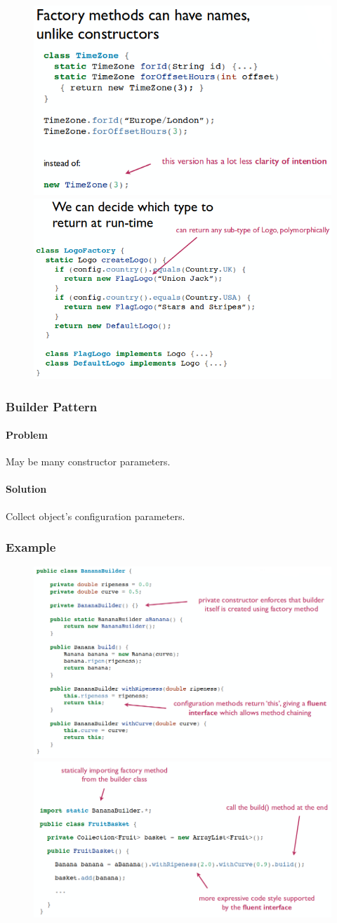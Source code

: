 \documentclass[twocolumn,english]{article}
\begin{document}
\begin{figure}[H]
\centering{}\includegraphics[width=0.45\columnwidth]{img/factory}\includegraphics[width=0.5\columnwidth]{img/factory2}
\end{figure}

\subsubsection{Builder Pattern}

\paragraph{Problem}

May be many constructor parameters.

\paragraph{Solution}

Collect object's configuration parameters.

\subsubsection*{Example}

\begin{figure}[H]
\centering{}\includegraphics[width=0.55\columnwidth]{img/builder}\includegraphics[width=0.45\columnwidth]{img/builder2}
\end{figure}
\end{document}
